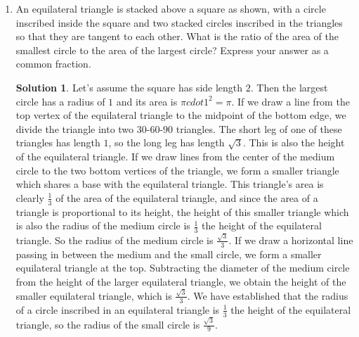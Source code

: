 \documentclass{article}
\theoremstyle{definition}
\newtheorem*{solution}{Solution}
\begin{document}
\begin{multicols}{2}
\begin{enumerate}
        \item An equilateral triangle is stacked above a square as shown, with a circle inscribed inside the square and two stacked circles inscribed in the triangles so that they are tangent to each other.
            What is the ratio of the area of the smallest circle to the area of the largest circle?
            Express your answer as a common fraction.
            \begin{center}
            \end{center}
            \begin{solution}
                Let's assume the square has side length $2$.
                Then the largest circle has a radius of $1$ and its area is $\pi cdot 1^2 = \pi$.
                If we draw a line from the top vertex of the equilateral triangle to the midpoint of the bottom edge, we divide the triangle into two $30$-$60$-$90$ triangles.
                The short leg of one of these triangles has length $1$, so the long leg has length $\sqrt{3}$.
                This is also the height of the equilateral triangle.
                If we draw lines from the center of the medium circle to the two bottom vertices of the triangle, we form a smaller triangle which shares a base with the equilateral triangle.
                This triangle's area is clearly $\frac{1}{3}$ of the area of the equilateral triangle, and since the area of a triangle is proportional to its height, the height of this smaller triangle which is also the radius of the medium circle is $\frac{1}{3}$ the height of the equilateral triangle.
                So the radius of the medium circle is $\frac{\sqrt{3}}{3}$.
                If we draw a horizontal line passing in between the medium and the small circle, we form a smaller equilateral triangle at the top.
                Subtracting the diameter of the medium circle from the height of the larger equilateral triangle, we obtain the height of the smaller equilateral triangle, which is $\frac{\sqrt{3}}{3}$.
                We have established that the radius of a circle inscribed in an equilateral triangle is $\frac{1}{3}$ the height of the equilateral triangle, so the radius of the small circle is $\frac{\sqrt{3}}{9}$.

\end{solution}
\end{enumerate}
\end{multicols}
\end{document}
